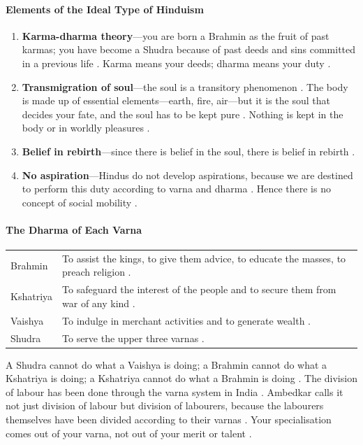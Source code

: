 \paragraph{Elements of the Ideal Type of Hinduism}
\begin{enumerate}
    \item \textbf{Karma-dharma theory}---you are born a Brahmin as the fruit of past karmas; you have become a Shudra because of past deeds and sins committed in a previous life . Karma means your deeds; dharma means your duty .
    \item \textbf{Transmigration of soul}---the soul is a transitory phenomenon . The body is made up of essential elements---earth, fire, air---but it is the soul that decides your fate, and the soul has to be kept pure . Nothing is kept in the body or in worldly pleasures .
    \item \textbf{Belief in rebirth}---since there is belief in the soul, there is belief in rebirth .
    \item \textbf{No aspiration}---Hindus do not develop aspirations, because we are destined to perform this duty according to varna and dharma . Hence there is no concept of social mobility .
\end{enumerate}

\paragraph{The Dharma of Each Varna}
\vspace{6pt}
\noindent
\begin{tabularx}{\textwidth}{>{\hsize}Y >{\hsize}Y}
\toprule
{}
 &  \\
\midrule
Brahmin & To assist the kings, to give them advice, to educate the masses, to preach religion . \\
\midrule
Kshatriya & To safeguard the interest of the people and to secure them from war of any kind . \\
\midrule
Vaishya & To indulge in merchant activities and to generate wealth . \\
\midrule
Shudra & To serve the upper three varnas . \\
\bottomrule
\end{tabularx}
\vspace{6pt}

A Shudra cannot do what a Vaishya is doing; a Brahmin cannot do what a Kshatriya is doing; a Kshatriya cannot do what a Brahmin is doing . The division of labour has been done through the varna system in India .
Ambedkar calls it not just division of labour but division of labourers, because the labourers themselves have been divided according to their varnas . Your specialisation comes out of your varna, not out of your merit or talent .

